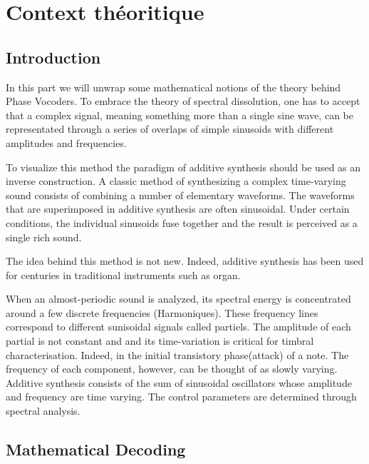 \chapter{Context théoritique}

\label{ch:contexte}

\section{Introduction}

In this part we will unwrap some mathematical notions of the theory behind Phase Vocoders. To embrace the theory of spectral dissolution, one has to accept that a complex signal, meaning something more than a single sine wave, can be representated through a series of overlaps of simple sinusoids with different amplitudes and frequencies.

To visualize this method the paradigm of additive synthesis should be used as an inverse construction. A classic method of synthesizing a complex time-varying sound consists of combining a number of elementary waveforms. The waveforms that are superimposed in additive synthesis are often sinusoidal. Under certain conditions, the individual sinusoids fuse together and the result is perceived as a single rich sound.

The idea behind this method is not new. Indeed, additive synthesis has been used for centuries in traditional instruments such as organ.

When an almost-periodic sound is analyzed, its spectral energy is concentrated around a few discrete frequencies (Harmoniques). These frequency lines correspond to different sunisoidal signals called partiels. The amplitude of each partial is not constant and and its time-variation is critical for timbral characterisation. Indeed, in the initial transistory phase(attack) of a note. The frequency of each component, however, can be thought of as slowly varying. Additive synthesis consists of the sum of sinusoidal oscillators whose amplitude and frequency are time varying. The control parameters are determined through spectral analysis.



\section{Mathematical Decoding}





